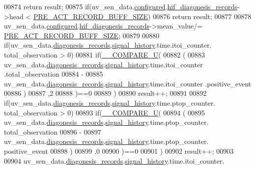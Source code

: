 \begin{DoxyCode}
00874 \textcolor{keywordflow}{return} result;
00875     \textcolor{keywordflow}{if}(uv\_sen\_data.\hyperlink{a00035_a94b2d1f6ea4ab334c74d24984dd27843}{configured}.\hyperlink{a00021_ae18294f7499d9fcb5ec796a1816b8cd8}{hif\_diagonesis\_records}->head < 
      \hyperlink{a00022_a18dcecc16ded13fa622e0913e73442e6}{PRE\_ACT\_RECORD\_BUFF\_SIZE})
00876         \textcolor{keywordflow}{return} result;
00877 
00878     uv\_sen\_data.\hyperlink{a00035_a94b2d1f6ea4ab334c74d24984dd27843}{configured}.\hyperlink{a00021_ae18294f7499d9fcb5ec796a1816b8cd8}{hif\_diagonesis\_records}->mean\_value/=
      \hyperlink{a00022_a18dcecc16ded13fa622e0913e73442e6}{PRE\_ACT\_RECORD\_BUFF\_SIZE};
00879 
00880     \textcolor{keywordflow}{if}(uv\_sen\_data.\hyperlink{a00035_a7ae905b560513ad201e58c2f63375030}{diagonesis\_records}.\hyperlink{a00017_affb63906d23cb1cb7787d61eaaedfb60}{signal\_history}.time.itoi\_counter.
      total\_observation > 0)
00881     \textcolor{keywordflow}{if}(\hyperlink{a00021_a2ec57e7d50ba444ecb9e5c8b717d832d}{\_\_COMPARE\_U}(
00882             (
00883             uv\_sen\_data.\hyperlink{a00035_a7ae905b560513ad201e58c2f63375030}{diagonesis\_records}.\hyperlink{a00017_affb63906d23cb1cb7787d61eaaedfb60}{signal\_history}.time.itoi\_counter
      .total\_observation
00884             -
00885             uv\_sen\_data.\hyperlink{a00035_a7ae905b560513ad201e58c2f63375030}{diagonesis\_records}.\hyperlink{a00017_affb63906d23cb1cb7787d61eaaedfb60}{signal\_history}.time.itoi\_counter
      .positive\_event
00886             )
00887             ,2
00888             )==0
00889            )
00890         result++;
00891 
00892     \textcolor{keywordflow}{if}(uv\_sen\_data.\hyperlink{a00035_a7ae905b560513ad201e58c2f63375030}{diagonesis\_records}.\hyperlink{a00017_affb63906d23cb1cb7787d61eaaedfb60}{signal\_history}.time.ptop\_counter.
      total\_observation > 0)
00893     \textcolor{keywordflow}{if}(\hyperlink{a00021_a2ec57e7d50ba444ecb9e5c8b717d832d}{\_\_COMPARE\_U}(
00894           (
00895            uv\_sen\_data.\hyperlink{a00035_a7ae905b560513ad201e58c2f63375030}{diagonesis\_records}.\hyperlink{a00017_affb63906d23cb1cb7787d61eaaedfb60}{signal\_history}.time.ptop\_counter.
      total\_observation
00896           -
00897            uv\_sen\_data.\hyperlink{a00035_a7ae905b560513ad201e58c2f63375030}{diagonesis\_records}.\hyperlink{a00017_affb63906d23cb1cb7787d61eaaedfb60}{signal\_history}.time.ptop\_counter.
      positive\_event
00898           )
00899          ,0
00900           )==0
00901        )
00902         result++;
00903 
00904     uv\_sen\_data.\hyperlink{a00035_a7ae905b560513ad201e58c2f63375030}{diagonesis\_records}.\hyperlink{a00017_affb63906d23cb1cb7787d61eaaedfb60}{signal\_history}.time.itoi\_counter.

\end{DoxyCode}
